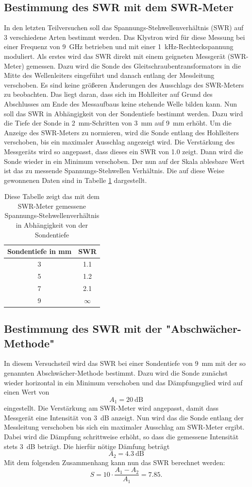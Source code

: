 \documentclass[a4paper]{article}
\begin{document}
\subsection{Bestimmung des SWR mit dem SWR-Meter}
In den letzten Teilversuchen soll das Spannungs-Stehwellenverhältnis (SWR) auf 3 verschiedene Arten bestimmt werden.
Das Klystron wird für diese Messung bei einer Frequenz von \SI{9}{\giga\hertz} betrieben und mit einer \SI{1}{\kilo\hertz}-Rechteckspannung moduliert. 
Als erstes wird das SWR direkt mit einem geigneten Messgerät (SWR-Meter) gemessen.
Dazu wird die Sonde des  Gleitschraubentransformators in die Mitte des Wellenleiters eingeführt und danach entlang der Messleitung verschoben. 
Es sind keine größeren Änderungen des Ausschlags des SWR-Meters zu beobachten.
Das liegt daran, dass sich im Hohlleiter auf Grund des Abschlusses am Ende des Messaufbaus keine stehende Welle bilden kann.
Nun soll das SWR in Abhängigkeit von der Sondentiefe bestimmt werden. Dazu wird die Tiefe der Sonde in \SI{2}{\milli\meter}-Schritten von \SI{3}{\milli\meter} auf \SI{9}{\milli\meter} erhöht.
Um die Anzeige des SWR-Meters zu normieren, wird die Sonde entlang des Hohlleiters verschoben, bis ein maximaler Ausschlag angezeigt wird. 
Die Verstärkung des Messgeräts wird so angepasst, dass dieses ein SWR von  \num{1,0} zeigt.
Dann wird die Sonde wieder in ein Minimum verschoben.
Der nun auf der Skala ablesbare Wert ist das zu messende Spannungs-Stehwellen Verhältnis.
Die auf diese Weise gewonnenen Daten sind in Tabelle \ref{swrtab} dargestellt.
\begin{table}
\centering
\begin{tabular}{cc}
\toprule
Sondentiefe in \si{\milli\meter} & SWR\\
\midrule
3 & 1.1 \\
5 & 1.2 \\
7 & 2.1 \\
9 & $\infty$\\
\bottomrule
\end{tabular}
\caption{Diese Tabelle zeigt das mit dem SWR-Meter gemessene Spannungs-Stehwellenverhältnis in Abhängigkeit von der Sondentiefe}
\label{swrtab}
\end{table}

\subsection{Bestimmung des SWR mit der "Abschwächer-Methode"}
In diesem Versuchsteil wird das SWR bei einer Sondentiefe von \SI{9}{\milli\meter} mit der so genannten Abschwächer-Methode bestimmt.
Dazu wird die Sonde zunächst wieder horizontal in ein Minimum verschoben und das Dämpfungsglied wird auf einen Wert von
\[
A_1 = \SI{20}{\dB}
\]
eingestellt. Die Verstärkung am SWR-Meter wird angepasst, damit dass Messgerät eine Intensität von \SI{3}{\dB} anzeigt. 
Nun wird das die Sonde entlang der Messleitung verschoben bis sich ein maximaler Ausschlag am SWR-Meter ergibt.
Dabei wird die Dämpfung schrittweise erhöht, so dass die gemessene Intensität stets \SI{3}{\dB} beträgt.
Die hierfür nötige Dämfung beträgt
\[
A_2 = \SI{4.3}{\dB}
\]
Mit dem folgenden Zusammenhang kann nun das SWR berechnet werden:
\[
S = 10 \cdot \frac{A_1 - A_2}{A_1} = \num{7,85}.
\]
\end{document}

